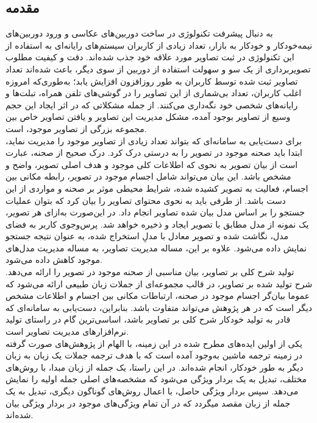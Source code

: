 \subsection{مقدمه}

به دنبال پیشرفت تکنولوژی در ساخت دوربین‌های عکاسی و ورود دوربین‌های نیمه‌خودکار و خودکار به بازار، تعداد زیادی از کاربران سیستم‌های رایانه‌ای به استفاده از این تکنولوژی در ثبت تصاویر مورد علاقه خود جذب شده‌اند. دقت و کیفیت مطلوب تصویربرداری از یک سو و سهولت استفاده از دوربین‌ از سوی دیگر، باعث شده‌اند تعداد تصاویر ثبت شده توسط کاربران به طور روزافزون افزایش یابد؛ به‌طوری‌که امروزه اغلب کاربران، تعداد بی‌شماری از این تصاویر را در گوشی‌های تلفن همراه، تبلت‌ها و رایانه‌های شخصی خود نگه‌داری می‌کنند.
از جمله مشکلاتی که در اثر ایجاد این حجم وسیع از تصاویر بوجود آمده، مشکل مدیریت این تصاویر و یافتن تصاویر خاص بین مجموعه بزرگی از تصاویر موجود، است.
\\
برای دست‌یابی به سامانه‌ای که بتواند تعداد زیادی از تصاویر موجود را مدیریت نماید، ابتدا باید صحنه موجود در تصویر را به درستی درک کرد. درک صحیح از صحنه، عبارت است از بیان تصویر به نحوی که اطلاعات کلی موجود و هدف اصلی تصویر، واضح و مشخص باشد. این بیان می‌تواند شامل اجسام موجود در تصویر، رابطه مکانی بین اجسام، فعالیت به تصویر کشیده شده، شرایط محیطی موثر بر صحنه و مواردی از این دست باشد. از طرفی باید به نحوی محتوای تصاویر را بیان کرد که بتوان عملیات جستجو را بر اساس مدل بیان شده تصاویر انجام داد. در این‌صورت به‌ازای هر تصویر، یک نمونه از مدل مطابق با تصویر ایجاد و ذخیره خواهد شد. پرس‌و‌جوی کاربر به فضای مدل، نگاشت شده و تصویر معادل با مدلِ استخراج شده، به عنوان نتیجه جستجو نمایش داده می‌شود. علاوه بر این، مساله مدیریت تصاویر، به مساله مدیریت مدل‌های موجود کاهش داده می‌شود.
\\
تولید شرح کلی بر تصاویر، بیان مناسبی از صحنه موجود در تصویر را ارائه می‌دهد. شرح تولید شده بر تصاویر، در قالب مجموعه‌ای از جملات زبان طبیعی ارائه‌ می‌شود که عموما بیان‌گر اجسام موجود در صحنه‌، ارتباطات مکانی بین اجسام و اطلاعات مشخص دیگر است که در هر پژوهش می‌تواند متفاوت باشد. بنابراین، دست‌یابی به سامانه‌ای که قادر به تولید خودکار شرح کلی بر تصاویر باشد، اساسی‌ترین گام در راستای تولید نرم‌افزارهای مدیریت تصاویر است.
\\
یکی از اولین ایده‌های مطرح شده در این زمینه، با الهام از پژوهش­‌های صورت گرفته در زمینه ترجمه ماشین
 به‌وجود آمده‌ است که با هدف ترجمه جملات یک زبان به زبان دیگر به طور خودکار، انجام شده‌اند. در این راستا، یک جمله از زبان مبدا، با روش‌های مختلف، تبدیل به یک بردار ویژگی می‌شود که مشخصه‌های اصلی جمله اولیه را نمایش می‌دهد. سپس بردار ویژگی حاصل، با اعمال روش­‌های گوناگون دیگری، تبدیل به یک جمله از زبان مقصد می­گردد که در آن تمام ویژگی‌های موجود در بردار ویژگی بیان شده‌‌اند.
